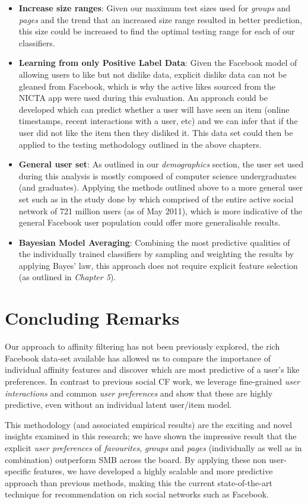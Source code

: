 \begin{itemize}
\item \textbf{Increase size ranges}: Given our maximum test sizes used for \emph{groups} and \emph{pages} and the trend that an increased
size range resulted in better prediction, this size could be 
increased to find the optimal testing range for each of our classifiers.
\item \textbf{Learning from only Positive Label Data}: Given the Facebook model of allowing users to like but not dislike data, explicit dislike data can not be 
gleaned from Facebook, which is why the active likes sourced from the NICTA app were used during this evaluation. An approach could be developed 
which can predict whether a user will have seen an item (online timestamps, recent interactions with a user, etc) and we can infer that if the 
user did not like the item then they disliked it. This data set could then be applied to the testing methodology outlined in the above chapters.
\item \textbf{General user set}: As outlined in our \emph{demographics} section, the user set used during this analysis is mostly composed of 
computer science undergraduates (and graduates). Applying the methods outlined above to a more general user set such as in the study done by \cite{jugand} which comprised of the entire active social network of 721 million users 
(as of May 2011), which is more indicative of the general Facebook user population could offer more 
generalisable results.
\item \textbf{Bayesian Model Averaging}: Combining the most predictive qualities of the individually trained classifiers by sampling and
weighting the results by applying Bayes' law, this approach does not require explicit feature selection (as outlined in \emph{Chapter 5}).
\end{itemize}

\section{Concluding Remarks}
\label{sec:cr}
Our approach to affinity filtering has not been previously explored, the rich Facebook data-set available has allowed us to compare 
the importance of individual affinity features and discover which are most predictive of a user's like preferences. In contrast to previous social 
CF work, we leverage fine-grained \emph{user interactions} and common \emph{user preferences} and show that these are highly predictive, 
even without an individual latent user/item model.

This methodology (and associated empirical results) are the exciting and novel insights examined in this research; we have shown 
the impressive result that the explicit \emph{user preferences} of
\emph{favourites}, \emph{groups} and \emph{pages} (individually as well as in combination) outperform SMB across the board. By 
applying these non user-specific features, we have developed a highly scalable and more predictive approach than previous methods,
making this the current state-of-the-art technique for recommendation on rich social networks such as Facebook.

